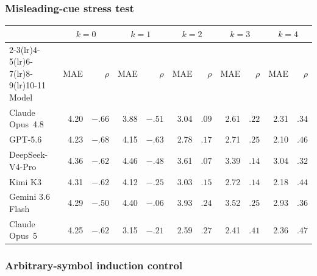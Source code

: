 \subsubsection{Misleading-cue stress test}

\begin{center}
\begin{minipage}{\linewidth}
\centering
{}
\label{tab:coin-city-wrong-context}
\small
\setlength{\tabcolsep}{4pt}
\begin{tabular}{l rr rr rr rr rr}
\toprule
& \multicolumn{2}{c}{$k{=}0$} & \multicolumn{2}{c}{$k{=}1$} & \multicolumn{2}{c}{$k{=}2$}
& \multicolumn{2}{c}{$k{=}3$} & \multicolumn{2}{c}{$k{=}4$} \\
\cmidrule(lr){2-3}\cmidrule(lr){4-5}\cmidrule(lr){6-7}\cmidrule(lr){8-9}\cmidrule(lr){10-11}
Model & MAE & $\rho$ & MAE & $\rho$ & MAE & $\rho$ & MAE & $\rho$ & MAE & $\rho$ \\
\midrule
Claude Opus~4.8 & 4.20 & $-.66$ & 3.88 & $-.51$ & 3.04 & $.09$ & 2.61 & $.22$ & 2.31 & $.34$ \\
GPT-5.6 & 4.23 & $-.68$ & 4.15 & $-.63$ & 2.78 & $.17$ & 2.71 & $.25$ & 2.10 & $.46$ \\
DeepSeek-V4-Pro & 4.36 & $-.62$ & 4.46 & $-.48$ & 3.61 & $.07$ & 3.39 & $.14$ & 3.04 & $.32$ \\
Kimi K3 & 4.31 & $-.62$ & 4.12 & $-.25$ & 3.03 & $.15$ & 2.72 & $.14$ & 2.18 & $.44$ \\
Gemini 3.6 Flash & 4.29 & $-.50$ & 4.40 & $-.06$ & 3.93 & $.24$ & 3.52 & $.25$ & 2.93 & $.36$ \\
Claude Opus~5 & 4.25 & $-.62$ & 3.15 & $-.21$ & 2.59 & $.27$ & 2.41 & $.41$ & 2.36 & $.47$ \\
\bottomrule
\end{tabular}
\end{minipage}
\end{center}

\subsubsection{Arbitrary-symbol induction control}

